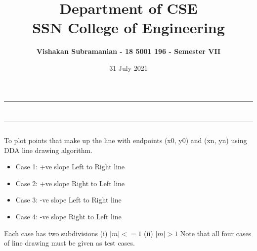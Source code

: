 \documentclass[12pt, a4]{article}
\title{\textbf{Department of CSE\\SSN College of Engineering}}
\author{\textbf{Vishakan Subramanian - 18 5001 196 - Semester VII}}
\date{31 July 2021}
\begin{document}
\maketitle
\hrule
\section*{}
\hrule
\bigskip

\subsection*{}
\subsection*{}
\begin{flushleft}
To plot points that make up the line with endpoints (x0, y0) and (xn, yn) using DDA line drawing algorithm.

\begin{itemize}
\item Case 1: +ve slope Left to Right line
\item Case 2: +ve slope Right to Left line
\item Case 3: -ve slope Left to Right line
\item Case 4: -ve slope Right to Left line
\end{itemize}
Each case has two subdivisions
(i) $|m| <= 1$ (ii) $|m| > 1$
\newline
\newline
Note that all four cases of line drawing must be given as test cases. 
\end{flushleft}

\newpage
\subsection*{}
\begin{flushleft}

\end{flushleft}


\newpage
\end{document}
